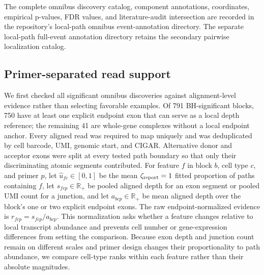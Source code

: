 \documentclass[11pt]{article}
\begin{document}
The complete omnibus discovery catalog, component annotations, coordinates, empirical p-values, FDR values, and literature-audit intersection are recorded in the repository's local-path omnibus event-annotation directory. The separate local-path full-event annotation directory retains the secondary pairwise localization catalog.

\clearpage
\subsection*{Primer-separated read support}

We first checked all significant omnibus discoveries against alignment-level evidence rather than selecting favorable examples. Of 791 BH-significant blocks, 750 have at least one explicit endpoint exon that can serve as a local depth reference; the remaining 41 are whole-gene complexes without a local endpoint anchor. Every aligned read was required to map uniquely and was deduplicated by cell barcode, UMI, genomic start, and CIGAR. Alternative donor and acceptor exons were split at every tested path boundary so that only their discriminating atomic segments contributed. For feature \(f\) in block \(b\), cell type \(c\), and primer \(p\), let \(\widehat u_{fc}\in[0,1]\) be the mean \(\zeta_{\rm report}=1\) fitted proportion of paths containing \(f\), let \(s_{fcp}\in\mathbb R_+\) be pooled aligned depth for an exon segment or pooled UMI count for a junction, and let \(a_{bcp}\in\mathbb R_+\) be mean aligned depth over the block's one or two explicit endpoint exons. The raw endpoint-normalized evidence is \(r_{fcp}=s_{fcp}/a_{bcp}\). This normalization asks whether a feature changes relative to local transcript abundance and prevents cell number or gene-expression differences from setting the comparison. Because exon depth and junction count remain on different scales and primer design changes their proportionality to path abundance, we compare cell-type ranks within each feature rather than their absolute magnitudes.
\end{document}
